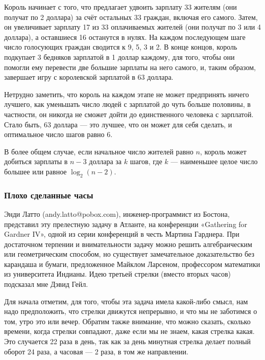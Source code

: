 Король начинает с того, что предлагает удвоить зарплату 33 жителям (они получат по 2 доллара) за счёт остальных 33 граждан, включая его самого.
Затем, он увеличивает зарплату 17 из 33 оплачиваемых жителей (они получат по 3 или 4 доллара), а оставшиеся 16 останутся в нулях.
На каждом последующем шаге число голосующих граждан сводится к 9, 5, 3 и 2.
В конце концов, король подкупает 3 бедняков зарплатой в 1 доллар каждому, для того, чтобы они помогли ему перевести две большие зарплаты на него самого, и, таким образом, завершает игру с королевской зарплатой в 63 доллара.

Нетрудно заметить, что король на каждом этапе не может предпринять ничего лучшего, как уменьшать число людей с зарплатой до чуть больше половины, в частности, он никогда не сможет дойти до единственного человека с зарплатой.
Стало быть, 63 доллара --- это лучшее, что он может для себя сделать, и оптимальное число шагов равно 6.
\heart

В более общем случае, если начальное число жителей равно $n$, король может добиться зарплаты в $n-3$ доллара за $k$ шагов, где $k$ --- наименьшее целое число большее или равное $\log_2(n-2)$.

\subsubsection*{Плохо сделанные часы}%

Энди Латто %
(andy.latto@pobox.com), инженер-программист из Бостона, представил эту прелестную задачу в Атланте, на конференции «Gathering for Gardner IV», одной из серии конференций в честь Мартина Гарднера.
При достаточном терпении и внимательности задачу можно решить алгебраическим или геометрическим способом, но существует замечательное доказательство %
без карандаша и бумаги, предложенное Майклом Ларсеном, %
профессором математики из университета Индианы.
Идею третьей стрелки (вместо вторых часов) подсказал мне Дэвид Гейл. %

Для начала отметим, для того, чтобы эта задача имела какой-либо смысл, нам надо предположить, что стрелки движутся непрерывно, и что мы не заботимся о том, утро это или вечер.
Обратим также внимание, что можно сказать, сколько времени, когда стрелки совпадают, даже если мы не знаем, какая стрелка какая.
Это случается 22 раза в день, так как за день минутная стрелка делает полный оборот 24 раза, а часовая --- 2 раза, в том же направлении.

